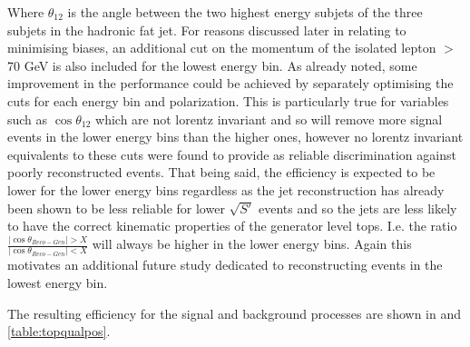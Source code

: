 Where $\theta_{12}$ is the angle between the two highest energy subjets of the three subjets in the hadronic fat jet. For reasons discussed later in  relating to minimising biases, an additional cut on the momentum of the isolated lepton $>$ 70 GeV is also included for the lowest energy bin. As already noted, some improvement in the performance could be achieved by separately optimising the cuts for each energy bin and polarization. This is particularly true for variables such as $\cos\theta_{12}$ which are not lorentz invariant and so will remove more signal events in the lower energy bins than the higher ones, however no lorentz invariant equivalents to these cuts were found to provide as reliable discrimination against poorly reconstructed events. That being said, the efficiency is expected to be lower for the lower energy bins regardless as the jet reconstruction has already been shown to be less reliable for lower $\sqrt{S'}$ events and so the jets are less likely to have the correct kinematic properties of the generator level tops. I.e. the ratio  $\frac{|\cos\theta_{Reco-Gen}| > X}{|\cos\theta_{Reco-Gen}| < X}$ will always be higher in the lower energy bins. Again this motivates an additional future study dedicated to reconstructing events in the lowest energy bin.

The resulting efficiency for the signal and background processes are shown in  and \ref{table:topqualpos}.

